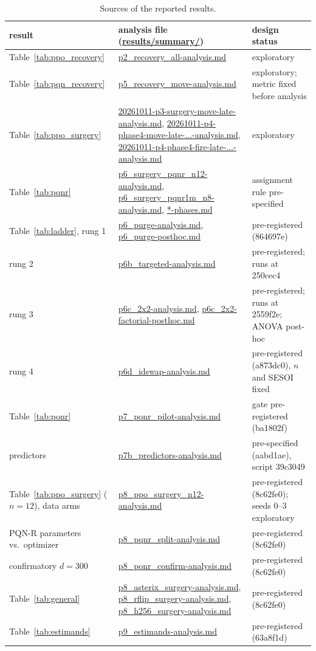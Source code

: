\documentclass[10pt]{article} %
\begin{document}
\begin{table}[h]
\centering
\caption{Sources of the reported results.}
\footnotesize
\begin{tabular}{p{3.0cm}p{7.6cm}p{4.0cm}}
\toprule
result & analysis file (\url{results/summary/}) & design status \\
\midrule
Table~\ref{tab:ppo_recovery} & \url{p2_recovery_all-analysis.md} & exploratory \\
Table~\ref{tab:pqn_recovery} & \url{p5_recovery_move-analysis.md} & exploratory; metric fixed before analysis \\
Table~\ref{tab:ppo_surgery} & \url{20261011-p3-surgery-move-late-analysis.md}, \url{20261011-p4-phase4-move-late-...-analysis.md}, \url{20261011-p4-phase4-fire-late-...-analysis.md} & exploratory \\
Table~\ref{tab:pqnr} & \url{p6_surgery_pqnr_n12-analysis.md}, \url{p6_surgery_pqnr1m_n8-analysis.md}, \url{*-phases.md} & assignment rule pre-specified \\
Table~\ref{tab:ladder}, rung 1 & \url{p6_purge-analysis.md}, \url{p6_purge-posthoc.md} & pre-registered (864697e) \\
rung 2 & \url{p6b_targeted-analysis.md} & pre-registered; runs at 250cec4 \\
rung 3 & \url{p6c_2x2-analysis.md}, \url{p6c_2x2-factorial-posthoc.md} & pre-registered; runs at 2559f2e; ANOVA post-hoc \\
rung 4 & \url{p6d_idswap-analysis.md} & pre-registered (a873dc0), $n$ and SESOI fixed \\
Table~\ref{tab:ponr} & \url{p7_ponr_pilot-analysis.md} & gate pre-registered (ba1802f) \\
predictors & \url{p7b_predictors-analysis.md} & pre-specified (aabd1ae), script 39c3049 \\
Table~\ref{tab:ppo_surgery} ($n=12$), data arms & \url{p8_ppo_surgery_n12-analysis.md} & pre-registered (8c62fe0); seeds 0--3 exploratory \\
PQN-R parameters vs.\ optimizer & \url{p8_pqnr_split-analysis.md} & pre-registered (8c62fe0) \\
confirmatory $d=300$ & \url{p8_ponr_confirm-analysis.md} & pre-registered (8c62fe0) \\
Table~\ref{tab:general} & \url{p8_asterix_surgery-analysis.md}, \url{p8_rflip_surgery-analysis.md}, \url{p8_h256_surgery-analysis.md} & pre-registered (8c62fe0) \\
Table~\ref{tab:estimands} & \url{p9_estimands-analysis.md} & pre-registered (63a8f1d) \\

\end{tabular}
\end{table}
\end{document}
